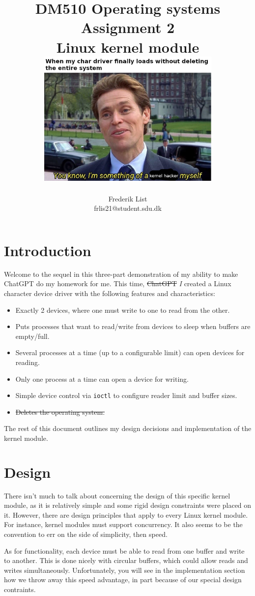 \documentclass{report}
\title{
	DM510 Operating systems \\
	Assignment 2 \\
	\normalsize Linux kernel module \\
	\vspace{1cm}
	\includegraphics[width=9cm, frame]{kernel_hacker.jpg}
}
\author{
	Frederik List \\
	\small frlis21@student.sdu.dk \\
}
\begin{document}
\maketitle

\section*{Introduction}

Welcome to the sequel in this three-part demonstration of my ability to make ChatGPT do my homework for me.
This time, \sout{ChatGPT} \emph{I} created a Linux character device driver with the following features and characteristics:

\begin{itemize}
	\item Exactly 2 devices, where one must write to one to read from the other.
	\item Puts processes that want to read/write from devices to sleep when buffers are empty/full.
	\item Several processes at a time (up to a configurable limit) can open devices for reading.
	\item Only one process at a time can open a device for writing.
	\item Simple device control via \texttt{ioctl} to configure reader limit and buffer sizes.
	\item \sout{Deletes the operating system.}
\end{itemize}

The rest of this document outlines my design decisions and implementation of the kernel module.

\section*{Design}

There isn't much to talk about concerning the design of this specific kernel module,
as it is relatively simple and some rigid design constraints were placed on it.
However, there are design principles that apply to every Linux kernel module.
For instance, kernel modules must support concurrency.
It also seems to be the convention to err on the side of simplicity, then speed.

As for functionality, each device must be able to read from one buffer and write to another.
This is done nicely with circular buffers, which could allow reads and writes simultaneously.
Unfortunately, you will see in the implementation section how we throw away this speed advantage,
in part because of our special design contraints.
\end{document}
